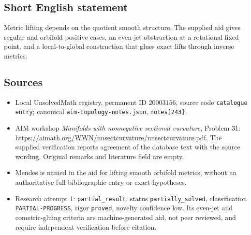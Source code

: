 \documentclass[11pt]{article}
\begin{document}
\subsection{Short English statement}
Metric lifting depends on the quotient smooth structure. The supplied aid gives regular and orbifold positive cases, an even-jet obstruction at a rotational fixed point, and a local-to-global construction that glues exact lifts through inverse metrics.
\subsection{Sources}
\begin{itemize}
\item Local UnsolvedMath registry, permanent ID $20003156$, source code \texttt{catalogue entry}; canonical \texttt{aim-topology-notes.json}, \texttt{notes[243]}.
\item AIM workshop \emph{Manifolds with nonnegative sectional curvature}, Problem 31: \url{https://aimath.org/WWN/nnsectcurvature/nnsectcurvature.pdf}. The supplied verification reports agreement of the database text with the source wording. Original remarks and literature field are empty.
\item Mendes is named in the aid for lifting smooth orbifold metrics, without an authoritative full bibliographic entry or exact hypotheses.
\item Research attempt 1: \texttt{partial\_result}, status \texttt{partially\_solved}, classification \texttt{PARTIAL-PROGRESS}, rigor \texttt{proved}, novelty confidence low. Its even-jet and cometric-gluing criteria are machine-generated aid, not peer reviewed, and require independent verification before citation.
\end{itemize}
\end{document}
